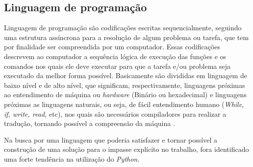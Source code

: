 \subsection{\textbf{Linguagem de programação}}

Linguagem de programação são codificações escritas sequencialmente, seguindo uma estrutura assíncrona para a resolução de algum problema ou tarefa, que tem por finalidade ser compreendida por um computador. Essas codificações descrevem ao computador a sequência lógica de execução das funções e os comandos nos quais ele deve executar para que a tarefa e/ou problema seja executado da melhor forma possível. Basicamente são divididas em linguagem de baixo nível e de alto nível, que significam, respectivamente, linguagens próximas ao entendimento de máquina ou \textit{hardware} (Binário ou hexadecimal) e linguagens próximas as linguagens naturais, ou seja, de fácil entendimento humano (\textit{While, if, write, read,} etc), nos quais são necessários compiladores para realizar a tradução, tornando possível a compreensão da máquina \cite{KELLEHER2005}.

Na busca por uma linguagem que poderia satisfazer e tornar possível a construção de uma solução para o impasse explícito no trabalho, fora identificado uma forte tendência na utilização do \textit{Python}.

\begin{comment}
De acordo com \citeonline{PILGRIM2009}, a projeção da linguagem enfatiza o trabalho do programador sobre o computacional, possibilitando assim a construção de bibliotecas e frameworks com uma facilidade acima do normal.

\textit{Python} foi criado por Guido van Rossum em 1991, com a ajuda de seus colegas Jack Jansen e Sjoerd Mullender. O objetivo deles era criar uma linguagem de fácil entendimento, orientada a objetos, menos complexa possível \cite{SONGINI2005}.

Segundo \citeonline{OLIVEIRA2007}, a linguagem sofreu vários ajustes no decorrer dos anos, tornando-se muito popular dentre os desenvolvedores e, consequentemente, dando início a enumeras aplicações. Portanto, \textit{Python} é uma linguagem orientada a objetos, fortemente tipada, com propositos gerais de alto nível e de código aberto, objetivando uma construção ágil no desenvolvimento de aplicações. Sua sintaxe e bem simples e de fácil entendimento, reduzindo o custo de manutenção em \textit{softwares} criados a partir desta. Suas bibliotecas garantem ao programador um vasto acervo de funções que tem por finalidade facilitar o seu trabalho, reduzir tempo de codificação e evitar arquivos com extensas linhas de código. Devido à comunidade de código aberto, onde desenvolvedores tem acesso ao seu código fonte, a popularização da linguagem vem crescendo de forma significativa, visto que esta ainda não é muito conhecida \cite{SONGINI2005}.
\end{comment}